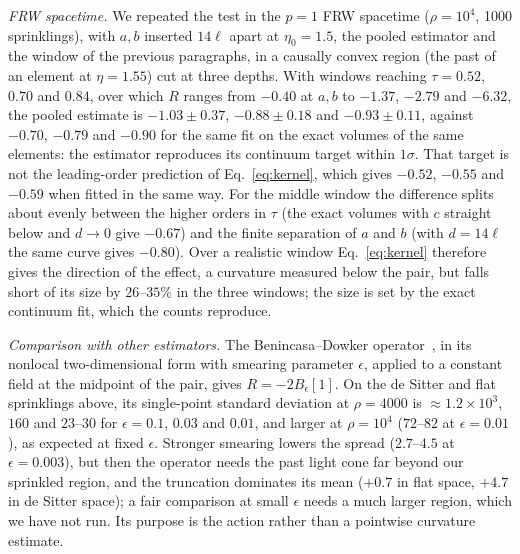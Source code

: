 \documentclass[prd,twocolumn,superscriptaddress,nofootinbib,amsmath,amssymb,floatfix]{revtex4-2}
\begin{document}
\emph{FRW spacetime.} We repeated the test in the $p=1$ FRW spacetime ($\rho=10^4$, 1000 sprinklings), with $a,b$ inserted $14\ell$ apart at $\eta_0=1.5$, the pooled estimator and the window of the previous paragraphs, in a causally convex region (the past of an element at $\eta=1.55$) cut at three depths. With windows reaching $\tau=0.52$, $0.70$ and $0.84$, over which $R$ ranges from $-0.40$ at $a,b$ to $-1.37$, $-2.79$ and $-6.32$, the pooled estimate is $-1.03\pm0.37$, $-0.88\pm0.18$ and $-0.93\pm0.11$, against $-0.70$, $-0.79$ and $-0.90$ for the same fit on the exact volumes of the same elements: the estimator reproduces its continuum target within $1\sigma$. That target is not the leading-order prediction of Eq.~\eqref{eq:kernel}, which gives $-0.52$, $-0.55$ and $-0.59$ when fitted in the same way. For the middle window the difference splits about evenly between the higher orders in $\tau$ (the exact volumes with $c$ straight below and $d\to0$ give $-0.67$) and the finite separation of $a$ and $b$ (with $d=14\ell$ the same curve gives $-0.80$). Over a realistic window Eq.~\eqref{eq:kernel} therefore gives the direction of the effect, a curvature measured below the pair, but falls short of its size by $26$--$35\%$ in the three windows; the size is set by the exact continuum fit, which the counts reproduce.

\emph{Comparison with other estimators.} The Benincasa--Dowker operator~\cite{BD10}, in its nonlocal two-dimensional form with smearing parameter $\epsilon$, applied to a constant field at the midpoint of the pair, gives $R=-2B_\epsilon[1]$. On the de Sitter and flat sprinklings above, its single-point standard deviation at $\rho=4000$ is $\approx1.2\times10^3$, $160$ and $23$--$30$ for $\epsilon=0.1$, $0.03$ and $0.01$, and larger at $\rho=10^4$ ($72$--$82$ at $\epsilon=0.01$), as expected at fixed $\epsilon$. Stronger smearing lowers the spread ($2.7$--$4.5$ at $\epsilon=0.003$), but then the operator needs the past light cone far beyond our sprinkled region, and the truncation dominates its mean ($+0.7$ in flat space, $+4.7$ in de Sitter space); a fair comparison at small $\epsilon$ needs a much larger region, which we have not run. Its purpose is the action rather than a pointwise curvature estimate.
\end{document}
